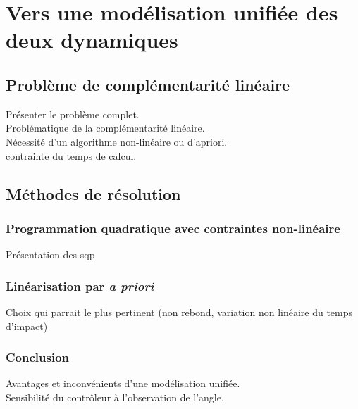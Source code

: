 \section{Vers une modélisation unifiée des deux dynamiques}
\subsection{Problème de complémentarité linéaire}

Présenter le problème complet.\\
Problématique de la complémentarité linéaire.\\
Nécessité d'un algorithme non-linéaire ou d'apriori.\\
contrainte du temps de calcul.

\subsection{Méthodes de résolution}
\subsubsection{Programmation quadratique avec contraintes non-linéaire}

Présentation des sqp

\subsubsection{Linéarisation par \textit{a priori}}

Choix qui parrait le plus pertinent (non rebond, variation non linéaire du temps d'impact)

\subsubsection{Conclusion}

Avantages et inconvénients d'une modélisation unifiée.\\
Sensibilité du contrôleur à l'observation de l'angle.